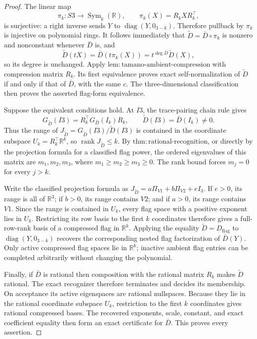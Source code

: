 \documentclass{article}
\begin{document}
\begin{proof}
The linear map
\[
 \pi_k:S3\longrightarrow\operatorname{Sym}_k(\mathbb R),
 \qquad \pi_k(X)=R_kXR_k^{\top},
\]
is surjective: a right inverse sends \(Y\) to
\(\operatorname{diag}(Y,0_{3-k})\).  Therefore pullback by \(\pi_k\)
is injective on polynomial rings.  It follows immediately that
\(\widetilde D=\bar D\circ\pi_k\) is nonzero and nonconstant whenever
\(\bar D\) is, and
\[
 \widetilde D(tX)
 =\bar D(t\pi_k(X))
 =t^{\deg\bar D}\widetilde D(X),
\]
so its degree is unchanged.  Apply
\(\mathrm{lem{:}tamano\text{-}ambient\text{-}compression}\) with
compression matrix \(R_k\).  Its first equivalence proves exact
self-normalization of \(\widetilde D\) if and only if that of \(\bar D\),
with the same \(c\).  The three-dimensional classification then proves
the asserted flag-form equivalence.

Suppose the equivalent conditions hold.  At \(I3\), the trace-pairing
chain rule gives
\[
 G_{\widetilde D}(I3)
 =R_k^{\top}G_{\bar D}(I_k)R_k,
 \qquad
 \widetilde D(I3)=\bar D(I_k)\neq0.
\]
Thus the range of
\(J_{\widetilde D}=G_{\widetilde D}(I3)/\widetilde D(I3)\) is contained
in the coordinate subspace \(U_k=R_k^{\top}\mathbb R^k\), so
\(\operatorname{rank}J_{\widetilde D}\leq k\).  By
\(\mathrm{thm{:}rational\text{-}recognition}\), or directly by the
projection formula for a classified flag power, the ordered eigenvalues
of this matrix are \(m_1,m_2,m_3\), where
\(m_1\geq m_2\geq m_3\geq0\).  The rank bound forces
\(m_j=0\) for every \(j>k\).

Write the classified projection formula as
\(J_{\widetilde D}=a\Pi_{V1}+b\Pi_{V2}+eI_3\).  If \(e>0\), its range
is all of \(\mathbb R^3\); if \(b>0\), its range contains \(V2\); and
if \(a>0\), its range contains \(V1\).  Since the range is contained in
\(U_k\), every flag space with a positive exponent lies in \(U_k\).
Restricting its row basis to the first \(k\) coordinates therefore gives
a full-row-rank basis of a compressed flag in \(\mathbb R^k\).  Applying
the equality \(\widetilde D=D_{\mathrm{flag}}\) to
\(\operatorname{diag}(Y,0_{3-k})\) recovers the corresponding nested
flag factorization of \(\bar D(Y)\).  Only active compressed flag spaces lie in \(\mathbb R^k\); inactive ambient flag entries can be completed arbitrarily without changing the polynomial.

Finally, if \(\bar D\) is rational then composition with the rational
matrix \(R_k\) makes \(\widetilde D\) rational.  The exact recognizer
therefore terminates and decides its membership.  On acceptance its
active eigenspaces are rational nullspaces.  Because they lie in the
rational coordinate subspace \(U_k\), restriction to the first \(k\)
coordinates gives rational compressed bases.  The recovered exponents,
scale, constant, and exact coefficient equality then form an exact
certificate for \(\bar D\).  This proves every assertion.
\end{proof}
\end{document}
